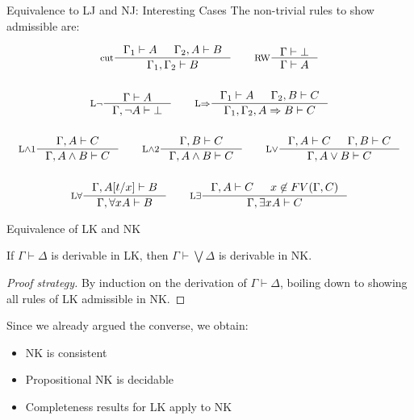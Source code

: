 \documentclass[xcolor=dvipsnames,aspectratio=169,handout]{beamer}
\begin{document}
\begin{frame}{Equivalence to LJ and NJ: Interesting Cases}
	The non-trivial rules to show admissible are:
	
	\begin{gather*}
		\inference[cut]{\Gamma_1\vdash A & \Gamma_2,A\vdash B}{\Gamma_1,\Gamma_2\vdash B}\hspace{2em}
		\inference[RW]{\Gamma\vdash\bot}{\Gamma\vdash A}\\[0,5cm]
		\inference[L$\neg$]{\Gamma \vdash A}{\Gamma,\neg A\vdash \bot}\hspace{2em}
		\inference[L$\to$]{\Gamma_1\vdash A & \Gamma_2,B\vdash C}{\Gamma_1,\Gamma_2,A\to B\vdash C}\\[0,5cm]
		\inference[L$\land$1]{\Gamma,A\vdash C}{\Gamma,A\land B\vdash C}\hspace{2em}
		\inference[L$\land$2]{\Gamma,B\vdash C}{\Gamma,A\land B\vdash C}\hspace{2em}
		\inference[L$\lor$]{\Gamma,A\vdash C & \Gamma,B\vdash C}{\Gamma, A\lor B\vdash C}\\[0,5cm]
		\inference[L$\forall$]{\Gamma,A[t/x]\vdash B}{\Gamma,\forall x A\vdash B}\hspace{2em}
		\inference[L$\exists$]{\Gamma, A\vdash C & x\not\in FV(\Gamma,C)}{\Gamma,\exists x A\vdash C}
	\end{gather*}
\end{frame}

\begin{frame}{Equivalence of LK and NK}
	\begin{theorem}
		If $\Gamma\vdash \Delta$ is derivable in LK, then $\Gamma\vdash \bigvee \Delta$ is derivable in NK.
	\end{theorem}
	\pause
	\begin{proof}[Proof strategy]
		By induction on the derivation of $\Gamma\vdash \Delta$, boiling down to showing all rules of LK admissible in NK.
	\end{proof}
	
	\pause
	\vspace{0.5cm}
	Since we already argued the converse, we obtain:
	\begin{itemize}
		\item
		NK is consistent
		\item
		Propositional NK is decidable
		\item
		Completeness results for LK apply to NK
	\end{itemize}
\end{frame}
\end{document}
